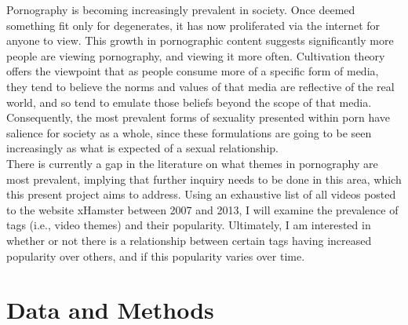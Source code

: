 \documentclass[11pt,]{article}
\begin{document}
Pornography is becoming increasingly prevalent in society. Once deemed
something fit only for degenerates, it has now proliferated via the
internet for anyone to view. This growth in pornographic content
suggests significantly more people are viewing pornography, and viewing
it more often. Cultivation theory offers the viewpoint that as people
consume more of a specific form of media, they tend to believe the norms
and values of that media are reflective of the real world, and so tend
to emulate those beliefs beyond the scope of that media. Consequently,
the most prevalent forms of sexuality presented within porn have
salience for society as a whole, since these formulations are going to
be seen increasingly as what is expected of a sexual relationship.\\
There is currently a gap in the literature on what themes in pornography
are most prevalent, implying that further inquiry needs to be done in
this area, which this present project aims to address. Using an
exhaustive list of all videos posted to the website xHamster between
2007 and 2013, I will examine the prevalence of tags (i.e., video
themes) and their popularity. Ultimately, I am interested in whether or
not there is a relationship between certain tags having increased
popularity over others, and if this popularity varies over time.

\section{Data and Methods}\label{data-and-methods}
\end{document}
